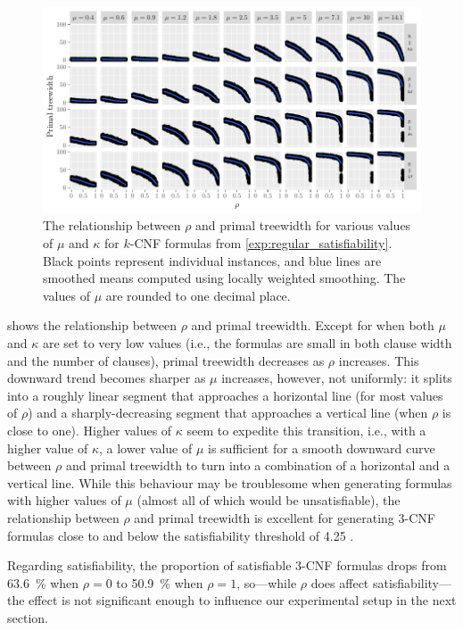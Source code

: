 \begin{figure}[t]
  \centering
  \includegraphics{chapters/comparison/regular_repetitiveness.pdf}
  \caption{The relationship between $\rho$ and primal treewidth for various
    values of $\mu$ and $\kappa$ for $k$-CNF formulas from
    \cref{exp:regular_satisfiability}. Black points represent individual
    instances, and blue lines are smoothed means computed using locally weighted
    smoothing. The values of $\mu$ are rounded to one decimal
    place.}\label{fig:regular_repetitiveness}
\end{figure}

 shows the relationship between $\rho$ and
primal treewidth. Except for when both $\mu$ and $\kappa$ are set to very low
values (i.e., the formulas are small in both clause width and the number of
clauses), primal treewidth decreases as $\rho$ increases. This downward trend
becomes sharper as $\mu$ increases, however, not uniformly: it splits into a
roughly linear segment that approaches a horizontal line (for most values of
$\rho$) and a sharply-decreasing segment that approaches a vertical line (when
$\rho$ is close to one). Higher values of $\kappa$ seem to expedite this
transition, i.e., with a higher value of $\kappa$, a lower value of $\mu$ is
sufficient for a smooth downward curve between $\rho$ and primal treewidth to
turn into a combination of a horizontal and a vertical line. While this
behaviour may be troublesome when generating formulas with higher values of
$\mu$ (almost all of which would be unsatisfiable), the relationship between
$\rho$ and primal treewidth is excellent for generating 3-CNF formulas close to
and below the satisfiability threshold of
4.25 \citep{DBLP:journals/ai/CrawfordA96}.

Regarding satisfiability, the proportion of satisfiable 3-CNF formulas drops
from \SI{63.6}{\percent} when $\rho = 0$ to \SI{50.9}{\percent} when $\rho = 1$,
so---while $\rho$ does affect satisfiability---the effect is not significant
enough to influence our experimental setup in the next section.

